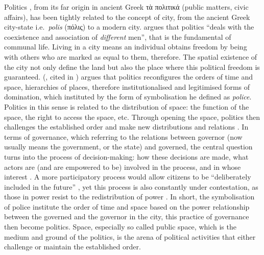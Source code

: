 Politics%
%
, from its far origin in ancient Greek τὰ πολιτικά (public matters, civic affairs), has been tightly related to the concept of city, from the ancient Greek city-state i.e.\ \textit{polis} (πόλις) to a modern city. \citet[p.~93]{arendt_introduction_2005} argues that politics ``deals with the coexistence and association of \textit{different} men'', that is the fundamental of communal life. Living in a city means an individual obtains freedom by being with others who are marked as equal to them, therefore. The spatial existence of the city not only define the land but also the place where this political freedom is guaranteed. \citeauthor{ranciere_et_2009} (\citeyear{ranciere_et_2009}, cited in \citealt[p.~673]{dikec_space_2012}) argues that politics reconfigures the orders of time and space, hierarchies of places, therefore institutionalised and legitimised forms of domination, which instituted by the form of symbolisation he defined as \textit{police}. Politics in this sense is related to the distribution of space: the function of the space, the right to access the space, etc. Through opening the space, politics then challenges the established order and make new distributions and relations \citep{ranciere_politics_2003}. In terms of governance, which referring to the relations between governor (now usually means the government, or the state) and governed, the central question turns into the process of decision-making: how these decisions are made, what actors are (and are empowered to be) involved in the process, and in whose interest \citep{martin_space_2003}. A more participatory process would allow citizens to be ``deliberately included in the future'' \citep[pp.~216]{arnstein_ladder_1969}, yet this process is also constantly under contestation, as those in power resist to the redistribution of power \citep{arnstein_ladder_1969}. In short, the symbolisation of police institute the order of time and space based on the power relationship between the governed and the governor in the city, this practice of governance then become politics. Space, especially so called public space, which is the medium and ground of the politics, is the arena of political activities that either challenge or maintain the established order.

